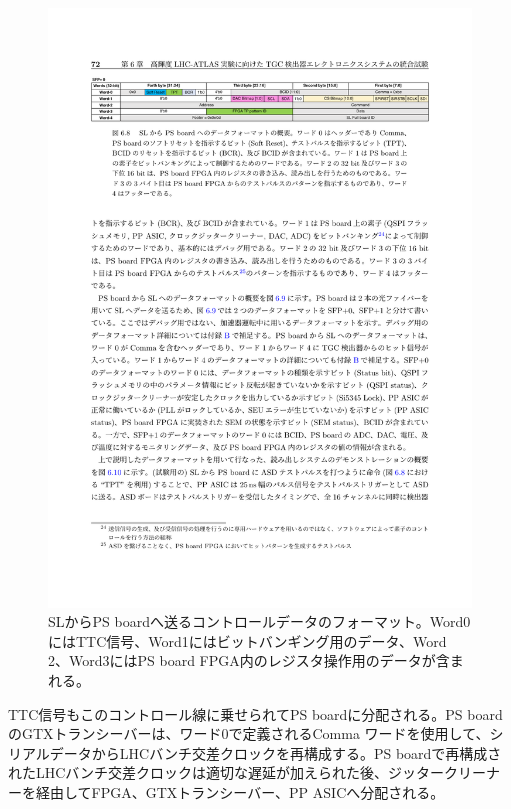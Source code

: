     \begin{figure} 
        \centering
        \includegraphics[width=16cm]{fig/Intro/TGC_PSBdownlink.pdf}
        \caption[SLからPS boardへ送るコントロールデータのフォーマット]{SLからPS boardへ送るコントロールデータのフォーマット\cite{mt_aoki}。Word0にはTTC信号、Word1にはビットバンギング用のデータ、Word 2、Word3にはPS board FPGA内のレジスタ操作用のデータが含まれる。}
        \label{TGC_PSBdownlink}
    \end{figure}
    
    TTC信号もこのコントロール線に乗せられてPS boardに分配される。PS boardのGTXトランシーバーは、ワード0で定義されるComma ワードを使用して、シリアルデータからLHCバンチ交差クロックを再構成する。PS boardで再構成されたLHCバンチ交差クロックは適切な遅延が加えられた後、ジッタークリーナーを経由してFPGA、GTXトランシーバー、PP ASICへ分配される。    

